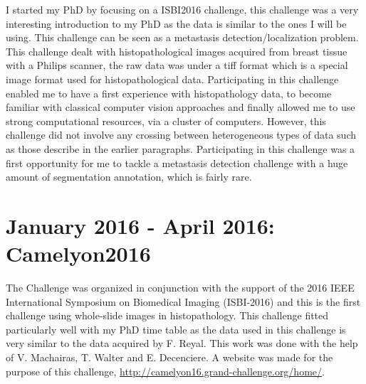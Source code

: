 \documentclass[a4paper,10pt]{article}
\begin{document}
I started my PhD by focusing on a ISBI2016 challenge, this challenge was a very interesting introduction to my PhD as the data is similar to the ones I will be using. This challenge can be seen as a metastasis detection/localization problem. This challenge dealt with histopathological images acquired from breast tissue with a Philips scanner, the raw data was under a tiff format which is a special image format used for histopathological data. Participating in this challenge enabled me to have a first experience with histopathology data, to become familiar with classical computer vision approaches and finally allowed me to use strong computational resources, via a cluster of computers. However, this challenge did not involve any crossing between heterogeneous types of data such as those describe in the earlier paragraphs. Participating in this challenge was a first opportunity for me to tackle a metastasis detection challenge with a huge amount of segmentation annotation, which is fairly rare.

\section{January 2016 - April 2016: Camelyon2016}

The Challenge was organized in conjunction with the support of the 2016 IEEE International Symposium on Biomedical Imaging  (ISBI-2016) and this is the first challenge using whole-slide images in histopathology. This challenge fitted particularly well with my PhD time table as the data used in this challenge is very similar to the data acquired by F. Reyal. 
This work was done with the help of V. Machairas, T. Walter and E. Decenciere. A website was made for the purpose of this challenge, \url{http://camelyon16.grand-challenge.org/home/}.
\\
\end{document}
